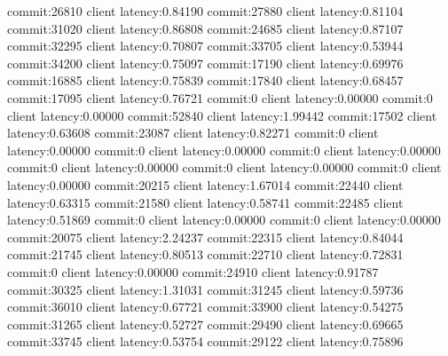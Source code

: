 commit:26810 client latency:0.84190
commit:27880 client latency:0.81104
commit:31020 client latency:0.86808
commit:24685 client latency:0.87107
commit:32295 client latency:0.70807
commit:33705 client latency:0.53944
commit:34200 client latency:0.75097
commit:17190 client latency:0.69976
commit:16885 client latency:0.75839
commit:17840 client latency:0.68457
commit:17095 client latency:0.76721
commit:0 client latency:0.00000
commit:0 client latency:0.00000
commit:52840 client latency:1.99442
commit:17502 client latency:0.63608
commit:23087 client latency:0.82271
commit:0 client latency:0.00000
commit:0 client latency:0.00000
commit:0 client latency:0.00000
commit:0 client latency:0.00000
commit:0 client latency:0.00000
commit:0 client latency:0.00000
commit:20215 client latency:1.67014
commit:22440 client latency:0.63315
commit:21580 client latency:0.58741
commit:22485 client latency:0.51869
commit:0 client latency:0.00000
commit:0 client latency:0.00000
commit:20075 client latency:2.24237
commit:22315 client latency:0.84044
commit:21745 client latency:0.80513
commit:22710 client latency:0.72831
commit:0 client latency:0.00000
commit:24910 client latency:0.91787
commit:30325 client latency:1.31031
commit:31245 client latency:0.59736
commit:36010 client latency:0.67721
commit:33900 client latency:0.54275
commit:31265 client latency:0.52727
commit:29490 client latency:0.69665
commit:33745 client latency:0.53754
commit:29122 client latency:0.75896